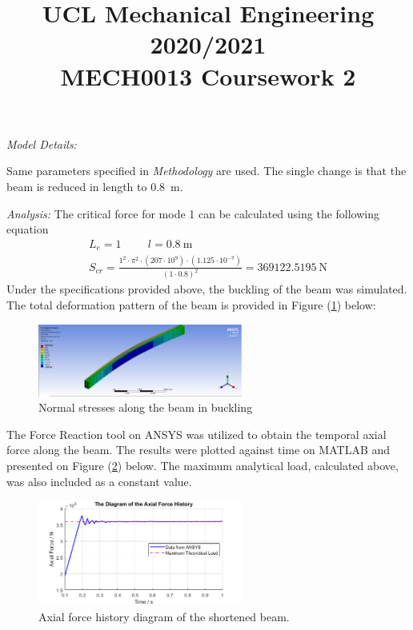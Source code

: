 \documentclass[11pt]{article}
\begin{document}
\title{\textbf{UCL Mechanical Engineering 2020/2021}\\MECH0013 Coursework 2}
\maketitle
\textit{Model Details:}

Same parameters specified in \textit{Methodology} are used. The single change is that the beam is reduced in length to \SI{0.8}{\meter}.

\textit{Analysis:}
The critical force for mode 1 can be calculated using the following equation
\begin{gather}
    L_e = 1 \hspace{1cm} l = \SI{0.8}{\meter}\\
    S_{cr} = \frac{1^2 \cdot \pi^2 \cdot\left(207\cdot10^9\right)\cdot\left(1.125\cdot 10^{-7}\right)}{(1\cdot 0.8)^2} = \SI{369122.5195}{\newton}
\end{gather}
Under the specifications provided above, the buckling of the beam was simulated. The total deformation pattern of the beam is provided in Figure (\ref{q3ss}) below:
\begin{figure}[H]
    \centering
    \includegraphics[width=0.6\textwidth]{q3normalstress1.png}
    \caption{Normal stresses along the beam in buckling}
    \label{q3ss}
\end{figure}
The Force Reaction tool on ANSYS was utilized to obtain the temporal axial force along the beam. The results were plotted against time on MATLAB and presented on Figure (\ref{q3axial}) below. The maximum analytical load, calculated above, was also included as a constant value.
\begin{figure}[H]
    \centering
    \includegraphics[width=0.6\textwidth]{q3axial.png}
    \caption{Axial force history diagram of the shortened beam.}
    \label{q3axial}
\end{figure}
\end{document}

